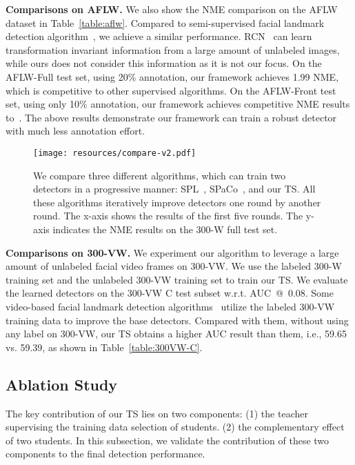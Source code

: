 \documentclass[10pt,twocolumn,letterpaper]{article}
\def\Tabref#1{Table~\ref{#1}}
\def\NAME{{{TS}}} \def\LLB{\textcolor{red}}
\begin{document}
\textbf{Comparisons on AFLW.}
We also show the NME comparison on the AFLW dataset in \Tabref{table:aflw}.
Compared to semi-supervised facial landmark detection algorithm~\cite{honari2018improving}, we achieve a similar performance.
RCN~\cite{honari2018improving} can learn transformation invariant information from a large amount of unlabeled images, while ours does not consider this information as it is not our focus.
On the AFLW-Full test set, using 20\% annotation, our framework achieves 1.99 NME, which is competitive to other supervised algorithms.
On the  AFLW-Front test set, using only 10\% annotation, our framework achieves competitive NME results to~\cite{dong2018san}.
The above results demonstrate our framework can train a robust detector with much less annotation effort.



\begin{figure}[t]
\center
\texttt{[image: resources/compare-v2.pdf]}
\caption{
We compare three different algorithms, which can train two detectors in a progressive manner: SPL~\cite{kumar2010self,jiang2015self}, SPaCo~\cite{ma2017self}, and our {\NAME}.
All these algorithms iteratively improve detectors one round by another round. The x-axis shows the results of the first five rounds. The y-axis indicates the NME results on the 300-W full test set.
}
\label{fig:compare}
\end{figure}


\textbf{Comparisons on 300-VW.}
We experiment our algorithm to leverage a large amount of unlabeled facial video frames on 300-VW.
We use the labeled 300-W training set and the unlabeled 300-VW training set to train our {\NAME}.
We evaluate the learned detectors on the 300-VW C test subset w.r.t. AUC~@~0.08.
Some video-based facial landmark detection algorithms~\cite{khan2017synergy,dong2018sbr} utilize the labeled 300-VW training data to improve the base detectors.
Compared with them, without using any label on 300-VW, our {\NAME} obtains a higher AUC result than them, i.e., 59.65 vs. 59.39, as shown in \Tabref{table:300VW-C}.







\subsection{Ablation Study}\label{sec:ablation}

The key contribution of our {\NAME} lies on two components:
(1) the teacher supervising the training data selection of students.
(2) the complementary effect of two students.
In this subsection, we validate the contribution of these two components to the final detection performance.
\end{document}
